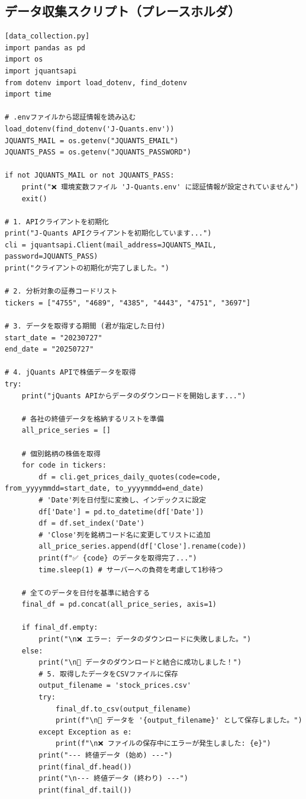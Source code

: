 \documentclass[a4paper, 11pt]{ltjsarticle}
\begin{document}
\subsection*{データ収集スクリプト（プレースホルダ）}
\begin{verbatim}
[data_collection.py]
import pandas as pd
import os
import jquantsapi
from dotenv import load_dotenv, find_dotenv
import time

# .envファイルから認証情報を読み込む
load_dotenv(find_dotenv('J-Quants.env'))
JQUANTS_MAIL = os.getenv("JQUANTS_EMAIL")
JQUANTS_PASS = os.getenv("JQUANTS_PASSWORD")

if not JQUANTS_MAIL or not JQUANTS_PASS:
    print("❌ 環境変数ファイル 'J-Quants.env' に認証情報が設定されていません")
    exit()

# 1. APIクライアントを初期化
print("J-Quants APIクライアントを初期化しています...")
cli = jquantsapi.Client(mail_address=JQUANTS_MAIL, password=JQUANTS_PASS)
print("クライアントの初期化が完了しました。")

# 2. 分析対象の証券コードリスト
tickers = ["4755", "4689", "4385", "4443", "4751", "3697"]

# 3. データを取得する期間 (君が指定した日付)
start_date = "20230727"
end_date = "20250727"

# 4. jQuants APIで株価データを取得
try:
    print("jQuants APIからデータのダウンロードを開始します...")
    
    # 各社の終値データを格納するリストを準備
    all_price_series = []

    # 個別銘柄の株価を取得
    for code in tickers:
        df = cli.get_prices_daily_quotes(code=code, from_yyyymmdd=start_date, to_yyyymmdd=end_date)
        # 'Date'列を日付型に変換し、インデックスに設定
        df['Date'] = pd.to_datetime(df['Date'])
        df = df.set_index('Date')
        # 'Close'列を銘柄コード名に変更してリストに追加
        all_price_series.append(df['Close'].rename(code))
        print(f"✅ {code} のデータを取得完了...")
        time.sleep(1) # サーバーへの負荷を考慮して1秒待つ

    # 全てのデータを日付を基準に結合する
    final_df = pd.concat(all_price_series, axis=1)

    if final_df.empty:
        print("\n❌ エラー: データのダウンロードに失敗しました。")
    else:
        print("\n🎉 データのダウンロードと結合に成功しました！")
        # 5. 取得したデータをCSVファイルに保存
        output_filename = 'stock_prices.csv'
        try:
            final_df.to_csv(output_filename)
            print(f"\n📄 データを '{output_filename}' として保存しました。")
        except Exception as e:
            print(f"\n❌ ファイルの保存中にエラーが発生しました: {e}")
        print("--- 終値データ (始め) ---")
        print(final_df.head())
        print("\n--- 終値データ (終わり) ---")
        print(final_df.tail())


\end{verbatim}
\end{document}
